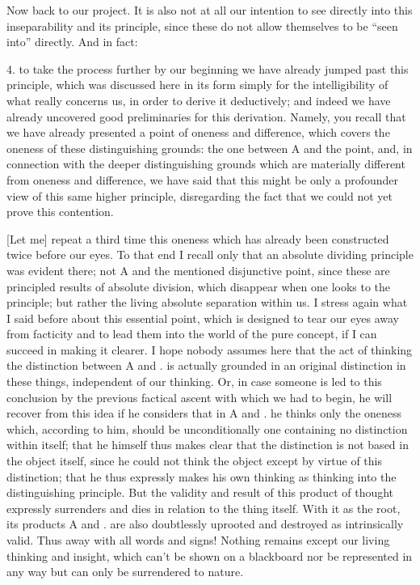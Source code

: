 Now back to our project.
It is also not at all our intention to see directly
into this inseparability and its principle,
since these do not allow themselves
to be “seen into” directly.
And in fact:

4. to take the process further
by our beginning we have already jumped past this principle,
which was discussed here in its form simply
for the intelligibility of what really concerns us,
in order to derive it deductively;
and indeed we have already uncovered
good preliminaries for this derivation.
Namely, you recall that we have already presented
a point of oneness and difference,
which covers the oneness of these distinguishing grounds:
the one between A and the point,
and, in connection with the deeper distinguishing grounds
which are materially different from oneness and difference,
we have said that this might be only a profounder view
of this same higher principle,
disregarding the fact that we could not
yet prove this contention.

[Let me] repeat a third time this oneness
which has already been constructed twice before our eyes.
To that end I recall only that
an absolute dividing principle was evident there;
not A and the mentioned disjunctive point,
since these are principled results of absolute division,
which disappear when one looks to the principle;
but rather the living absolute separation within us.
I stress again what I said before about this essential point,
which is designed to tear our eyes away from facticity
and to lead them into the world of the pure concept,
if I can succeed in making it clearer.
I hope nobody assumes here that the act of thinking
the distinction between A and . is actually grounded
in an original distinction in these things,
independent of our thinking.
Or, in case someone is led to this conclusion
by the previous factical ascent with which we had to begin,
he will recover from this idea if he considers
that in A and . he thinks only the oneness
which, according to him, should be unconditionally one
containing no distinction within itself;
that he himself thus makes clear that
the distinction is not based in the object itself,
since he could not think the object except
by virtue of this distinction;
that he thus expressly makes his own thinking as thinking
into the distinguishing principle.
But the validity and result of this product of thought
expressly surrenders and dies
in relation to the thing itself.
With it as the root, its products A and . are also
doubtlessly uprooted and destroyed as intrinsically valid.
Thus away with all words and signs!
Nothing remains except our living thinking and insight,
which can't be shown on a blackboard
nor be represented in any way
but can only be surrendered to nature.

